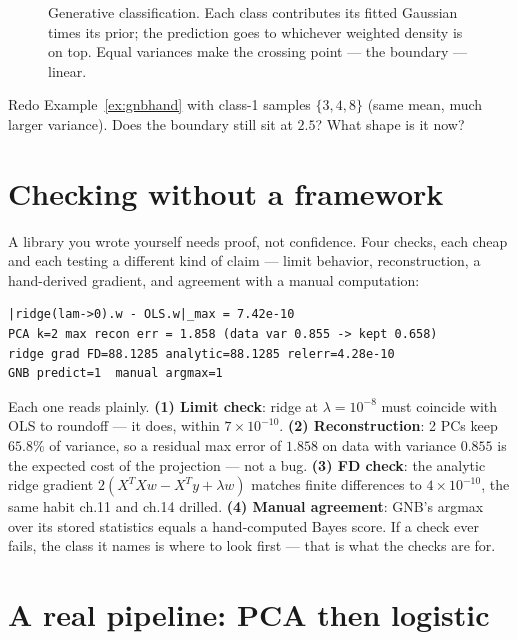\begin{figure}[htbp]
\centering

\caption{Generative classification. Each class contributes its fitted
Gaussian times its prior; the prediction goes to whichever weighted
density is on top. Equal variances make the crossing point ---
the boundary --- linear.}
\label{fig:gnb}
\end{figure}

\begin{exercise}[medium]
Redo Example~\ref{ex:gnbhand} with class-1 samples $\{3,4,8\}$
(same mean, much larger variance). Does the boundary still sit at
$2.5$? What shape is it now?
\end{exercise}

\section{Checking without a framework}\label{sec:checks}

A library you wrote yourself needs proof, not
confidence. Four checks, each cheap and each testing a different
kind of claim --- limit behavior, reconstruction, a hand-derived
gradient, and agreement with a manual computation:

\begin{lstlisting}[caption={\ttfamily code/ch16\_check.py run ---
four independent checks}]
|ridge(lam->0).w - OLS.w|_max = 7.42e-10
PCA k=2 max recon err = 1.858 (data var 0.855 -> kept 0.658)
ridge grad FD=88.1285 analytic=88.1285 relerr=4.28e-10
GNB predict=1  manual argmax=1
\end{lstlisting}

Each one reads plainly. \textbf{(1) Limit check}: ridge at
$\lambda=10^{-8}$ must coincide with OLS to roundoff --- it does,
within $7\times10^{-10}$. \textbf{(2) Reconstruction}: 2 PCs keep
$65.8\%$ of variance, so a residual max error of $1.858$ on data
with variance $0.855$ is the expected cost of the projection ---
not a bug. \textbf{(3) FD check}: the analytic ridge gradient
$2(X^TXw-X^Ty+\lambda w)$ matches finite differences to
$4\times10^{-10}$, the same habit ch.11 and ch.14 drilled.
\textbf{(4) Manual agreement}: GNB's argmax over its stored
statistics equals a hand-computed Bayes score. If a check ever
fails, the class it names is where to look first --- that is what
the checks are for.

\section{A real pipeline: PCA then logistic}\label{sec:pipeline}


